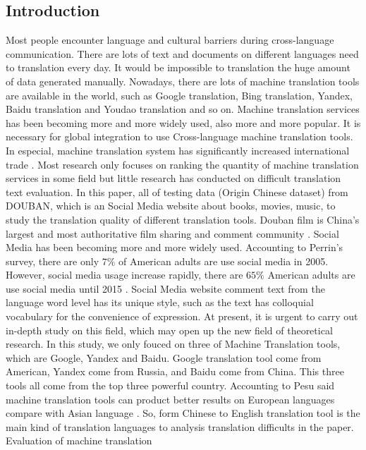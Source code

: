 \documentclass[conference]{IEEEtran}
\begin{document}
\begin{CJK*}{UTF8}{gbsn}
\section{Introduction}
Most people encounter language and cultural barriers during cross-language
communication. There are lots of text and documents on different languages need
to translation every day. It would be impossible to translation the huge amount
of data generated manually. Nowadays, there are lots of machine translation
tools are available in the world, such as Google translation, Bing translation,
Yandex, Baidu translation and Youdao translation and so on. Machine translation
services has been becoming more and more widely used, also more and more
popular. It is necessary for global integration to use Cross-language machine
translation tools. In especial, machine translation system has significantly
increased international trade \cite{brynjolfsson2018does}. Most research only
focuses on ranking the quantity of machine translation services in some field
\cite{pesu2018monte, aiken2010efficacy, koehn2006manual, somers2005round,
  shigenobu2007evaluation} but little research has conducted on difficult
translation text evaluation. In this paper, all of testing data (Origin Chinese
dataset) from DOUBAN, which is an Social Media website about books, movies,
music, to study the translation quality of different translation tools.
Douban film is China's largest and most authoritative
film sharing and comment community \cite{Douban}.
Social Media has been becoming more and more widely used.
Accounting to Perrin's survey, there are only $7\%$ of American adults are use
social media in 2005. However, social media usage increase rapidly, there are
$65\%$ American adults are use social media until 2015 \cite{perrin2015}.
Social Media website comment text from the language word level has its unique
style, such as the text has colloquial vocabulary for the convenience of
expression. At present, it is urgent to carry out in-depth study
on this field, which may open up the new field of theoretical research.
In this study, we only fouced on three of Machine Translation tools, which are
Google, Yandex and Baidu.
Google translation tool come from American, Yandex come from Russia, and Baidu
come from China. This three tools all come from the top three powerful country.
Accounting to Pesu said machine translation tools can product better results on
European languages compare with Asian language \cite{pesu2018monte}. So, form
Chinese to English translation tool is the main kind of translation languages to
analysis translation difficults in the paper. Evaluation of machine translation

\end{CJK*}
\end{document}
